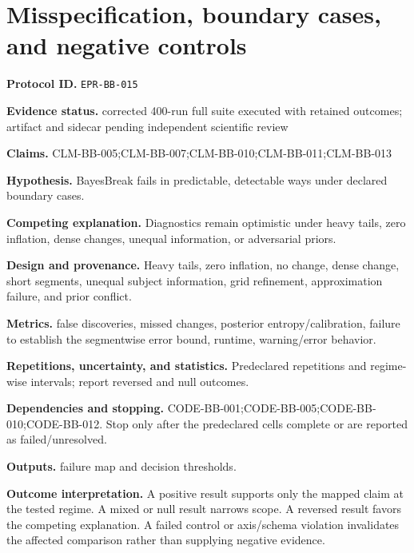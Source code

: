 \section[Misspecification and negative controls]{Misspecification, boundary cases, and negative controls}
\textbf{Protocol ID.} \texttt{EPR-BB-015}\par
\textbf{Evidence status.} corrected 400-run full suite executed with retained outcomes; artifact and sidecar pending independent scientific review\par
\textbf{Claims.} CLM-BB-005;CLM-BB-007;CLM-BB-010;CLM-BB-011;CLM-BB-013\par
\textbf{Hypothesis.} BayesBreak fails in predictable, detectable ways under declared boundary cases.\par
\textbf{Competing explanation.} Diagnostics remain optimistic under heavy tails, zero inflation, dense changes, unequal information, or adversarial priors.\par
\textbf{Design and provenance.} Heavy tails, zero inflation, no change, dense change, short segments, unequal subject information, grid refinement, approximation failure, and prior conflict.\par
\textbf{Metrics.} false discoveries, missed changes, posterior entropy/calibration, failure to establish the segmentwise error bound, runtime, warning/error behavior.\par
\textbf{Repetitions, uncertainty, and statistics.} Predeclared repetitions and regime-wise intervals; report reversed and null outcomes.\par
\textbf{Dependencies and stopping.} CODE-BB-001;CODE-BB-005;CODE-BB-010;CODE-BB-012. Stop only after the predeclared cells complete or are reported as failed/unresolved.\par
\textbf{Outputs.} failure map and decision thresholds.\par
\textbf{Outcome interpretation.} A positive result supports only the mapped claim at the tested regime. A mixed or null result narrows scope. A reversed result favors the competing explanation. A failed control or axis/schema violation invalidates the affected comparison rather than supplying negative evidence.
